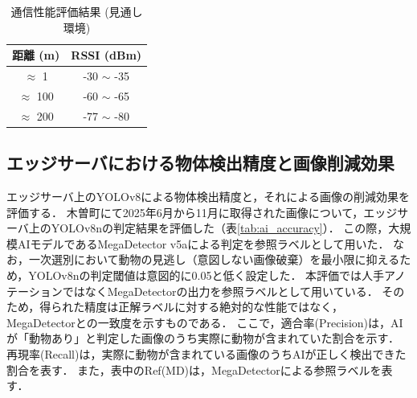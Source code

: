 \documentclass[technicalreport]{ieicej}
\begin{document}
\begin{table}[tb]
    \caption{通信性能評価結果 (見通し環境)}
    \label{tab:comm_perf}
    \centering
    \begin{tabular}{c|c}
        \hline
        距離 (m)        & RSSI (dBm)     \\
        \hline \hline
        $\approx$ 1   & -30 $\sim$ -35 \\
        $\approx$ 100 & -60 $\sim$ -65 \\
        $\approx$ 200 & -77 $\sim$ -80 \\
        \hline
    \end{tabular}
\end{table}

\subsection{エッジサーバにおける物体検出精度と画像削減効果}
エッジサーバ上のYOLOv8による物体検出精度と，それによる画像の削減効果を評価する．
木曽町にて2025年6月から11月に取得された画像について，エッジサーバ上のYOLOv8nの判定結果を評価した（表\ref{tab:ai_accuracy}）．
この際，大規模AIモデルであるMegaDetector v5aによる判定を参照ラベルとして用いた．
なお，一次選別において動物の見逃し（意図しない画像破棄）を最小限に抑えるため，YOLOv8nの判定閾値は意図的に0.05と低く設定した．
本評価では人手アノテーションではなくMegaDetectorの出力を参照ラベルとして用いている．
そのため，得られた精度は正解ラベルに対する絶対的な性能ではなく，MegaDetectorとの一致度を示すものである．
ここで，適合率(Precision)は，AIが「動物あり」と判定した画像のうち実際に動物が含まれていた割合を示す．
再現率(Recall)は，実際に動物が含まれている画像のうちAIが正しく検出できた割合を表す．
また，表中のRef(MD)は，MegaDetectorによる参照ラベルを表す．
\end{document}
